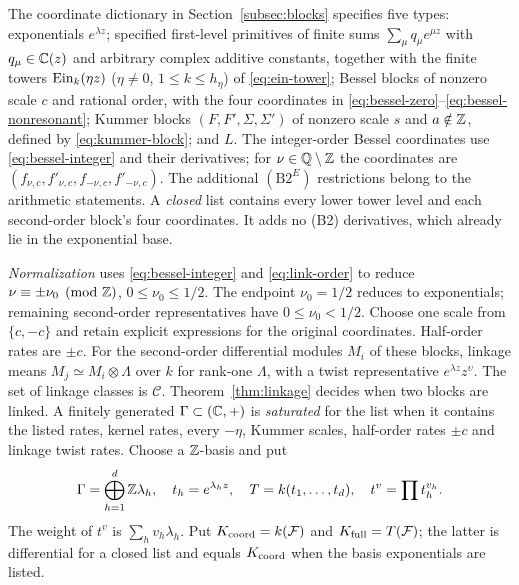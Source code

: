 The coordinate dictionary in Section~\ref{subsec:blocks} specifies five types:
exponentials $e^{\lambda z}$; specified first-level primitives of finite sums
$\sum_\mu q_\mu e^{\mu z}$ with $q_\mu\in\mathbb{C}(z)$ and arbitrary complex
additive constants, together with the finite towers $\operatorname{Ein}_k(\eta z)$
($\eta\ne0$, $1\le k\le h_\eta$) of \eqref{eq:ein-tower};
Bessel blocks of nonzero scale $c$ and rational order, with the four
coordinates in \eqref{eq:bessel-zero}--\eqref{eq:bessel-nonresonant};
Kummer blocks $(F,F',\Sigma,\Sigma')$ of nonzero scale $s$ and
$a\notin\mathbb{Z}$, defined by \eqref{eq:kummer-block}; and $L$.
The integer-order Bessel coordinates use \eqref{eq:bessel-integer} and
their derivatives; for $\nu\in\mathbb{Q}\setminus\mathbb{Z}$ the coordinates are
$(f_{\nu,c},f'_{\nu,c},f_{-\nu,c},f'_{-\nu,c})$.
The additional $(\mathrm{B2}^E)$ restrictions belong to the arithmetic statements.
A \emph{closed} list contains every lower tower level
and each second-order block's four coordinates. It adds no (B2)
derivatives, which already lie in the exponential base.

\emph{Normalization} uses \eqref{eq:bessel-integer} and
\eqref{eq:link-order} to reduce $\nu\equiv\pm\nu_0\pmod{\mathbb{Z}}$,
$0\le\nu_0\le1/2$. The endpoint $\nu_0=1/2$ reduces to exponentials;
remaining second-order representatives have $0\le\nu_0<1/2$.
Choose one scale from $\{c,-c\}$ and retain explicit expressions for the
original coordinates. Half-order rates are $\pm c$.
For the second-order differential modules $M_i$ of these blocks,
linkage means $M_j\simeq M_i\otimes\Lambda$ over $k$ for rank-one
$\Lambda$, with a twist representative $e^{\lambda z}z^\upsilon$.
The set of linkage classes is $\mathcal C$.
Theorem~\ref{thm:linkage} decides when two blocks are linked.
A finitely generated $\Gamma\subset(\mathbb{C},+)$ is \emph{saturated} for the
list when it contains the listed rates, kernel rates, every $-\eta$,
Kummer scales, half-order rates $\pm c$ and linkage twist rates.
Choose a $\mathbb{Z}$-basis and put
\begin{equation}\label{eq:exponential-field}
\Gamma=\bigoplus_{h=1}^d\mathbb{Z}\lambda_h,\quad t_h=e^{\lambda_hz},\quad
T=k(t_1,\ldots,t_d),\quad t^v=\prod t_h^{v_h}.
\end{equation}
The weight of $t^v$ is $\sum_hv_h\lambda_h$.
Put $K_{\rm coord}=k(\mathcal F)$ and $K_{\rm full}=T(\mathcal F)$;
the latter is differential for a closed list and equals $K_{\rm coord}$
when the basis exponentials are listed.

